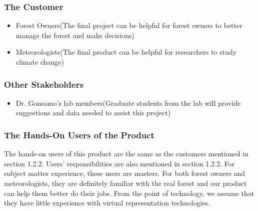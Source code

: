 \documentclass{article}
\begin{document}
\subsubsection{The Customer}
\begin{itemize}
    \item Forest Owners(The final project can be helpful for forest owners to better manage the 
    forest and make decisions)
    \item Meteorologists(The final product can be helpful for researchers to 
    study climate change)
\end{itemize}

\subsubsection{Other Stakeholders}
\begin{itemize}
    \item Dr. Gonsamo's lab members(Graduate students from the lab will provide suggestions and
    data needed to assist this project)
\end{itemize}

\subsubsection{The Hands-On Users of the Product}
The hands-on users of this product are the same as the customers mentioned in section 1.2.2. Users'
responsibilities are also mentioned in section 1.2.2. For subject matter experience, these 
users are masters. For both forest owners and meteorologists, they are definitely
familiar with the real forest and our product can help them better do
their jobs. From the point of technology, we assume that they 
have little experience with virtual representation
technologies.
\end{document}
